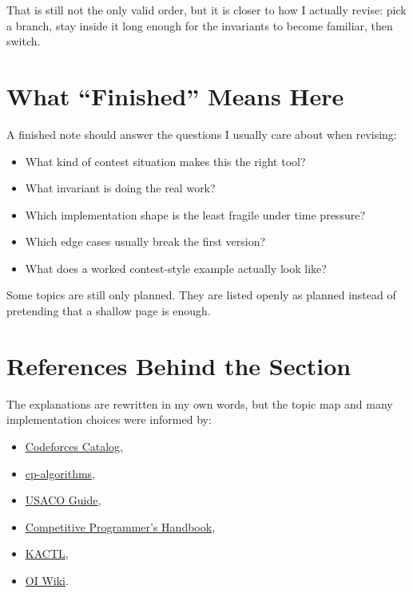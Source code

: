 That is still not the only valid order, but it is closer to how I actually revise: pick a branch, stay inside it long
enough for the invariants to become familiar, then switch.

\section*{What ``Finished'' Means Here}

A finished note should answer the questions I usually care about when revising:

\begin{itemize}
  \item What kind of contest situation makes this the right tool?
  \item What invariant is doing the real work?
  \item Which implementation shape is the least fragile under time pressure?
  \item Which edge cases usually break the first version?
  \item What does a worked contest-style example actually look like?
\end{itemize}

Some topics are still only planned. They are listed openly as planned instead of pretending that a shallow page
is enough.

\section*{References Behind the Section}

The explanations are rewritten in my own words, but the topic map and many implementation choices were informed by:

\begin{itemize}
  \item \href{https://codeforces.com/catalog}{Codeforces Catalog},
  \item \href{https://cp-algorithms.com/}{cp-algorithms},
  \item \href{https://usaco.guide/}{USACO Guide},
  \item \href{https://usaco.guide/CPH.pdf}{Competitive Programmer's Handbook},
  \item \href{https://github.com/kth-competitive-programming/kactl}{KACTL},
  \item \href{https://oi-wiki.org/}{OI Wiki}.
\end{itemize}

